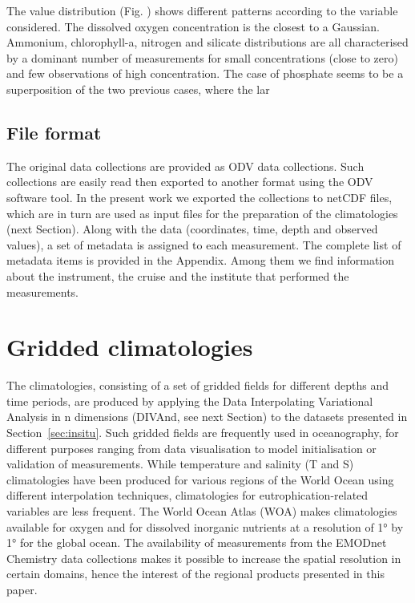 \documentclass[essd, manuscript]{copernicus}
\begin{document}
The value distribution (Fig. ) shows different patterns according to the variable considered. The dissolved oxygen concentration is the closest to a Gaussian. Ammonium, chlorophyll-a, nitrogen and silicate distributions are all characterised by a dominant number of measurements for small concentrations (close to zero) and few observations of high concentration. The case of phosphate seems to be a superposition of the two previous cases, where the lar







\subsection{File format}
The original data collections are provided as ODV \citep[Ocean Data View,][]{SCHLITZER02} data collections. Such collections are easily read then exported to another format using the ODV software tool. In the present work we exported the collections to netCDF files, which are in turn are used as input files for the preparation of the climatologies (next Section). 
Along with the data (coordinates, time, depth and observed values), a set of metadata is assigned to each measurement. The complete list of metadata items is provided in the Appendix. Among them we find information about the instrument, the cruise and the institute that performed the measurements. 

\section{Gridded climatologies\label{sec:clim}}

The climatologies, consisting of a set of gridded fields for different depths and time periods, are produced by applying the Data Interpolating Variational Analysis in n dimensions (DIVAnd, see next Section) to the datasets presented in Section~\ref{sec:insitu}. Such gridded fields are frequently used in oceanography, for different purposes ranging from data visualisation to model initialisation or validation of measurements.  
While temperature and salinity (T and S) climatologies have been produced for various regions of the World Ocean using different interpolation techniques, climatologies for eutrophication-related variables are less frequent. The World Ocean Atlas (WOA) makes climatologies available for oxygen \citep[Dissolved Oxygen, Apparent Oxygen Utilization, and Oxygen Saturation][]{GARCIA2018a} and for dissolved inorganic nutrients \citep[phosphate, nitrate and nitrate+nitrite, silicate][]{GARCIA2018b} at a resolution of 1° by 1° for the global ocean. The availability of measurements from the EMODnet Chemistry data collections makes it  possible to increase the spatial resolution in certain domains, hence the interest of the regional products presented in this paper.
\end{document}
